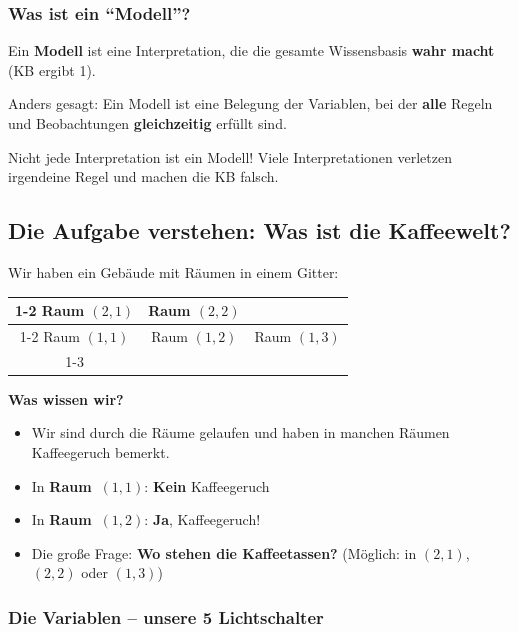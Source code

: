 \documentclass[a4paper,12pt]{article}
\begin{document}
\subsubsection*{Was ist ein "`Modell"'?}

\begin{merkbox}
Ein \textbf{Modell} ist eine Interpretation, die die gesamte Wissensbasis \textbf{wahr macht} (KB ergibt 1).

\medskip
Anders gesagt: Ein Modell ist eine Belegung der Variablen, bei der \textbf{alle} Regeln und Beobachtungen \textbf{gleichzeitig} erf\"ullt sind.

\medskip
Nicht jede Interpretation ist ein Modell! Viele Interpretationen verletzen irgendeine Regel und machen die KB falsch.
\end{merkbox}


\subsection{Die Aufgabe verstehen: Was ist die Kaffeewelt?}

Wir haben ein Geb\"aude mit R\"aumen in einem Gitter:

\begin{center}
\begin{tabular}{|c|c|c}
\cline{1-2}
Raum $(2{,}1)$ & Raum $(2{,}2)$ & \\
\cline{1-2}
Raum $(1{,}1)$ & Raum $(1{,}2)$ & Raum $(1{,}3)$ \\
\cline{1-3}
\end{tabular}
\end{center}

\textbf{Was wissen wir?}
\begin{itemize}
\item Wir sind durch die R\"aume gelaufen und haben in manchen R\"aumen Kaffeegeruch bemerkt.
\item In \textbf{Raum~$(1{,}1)$}: \textbf{Kein} Kaffeegeruch
\item In \textbf{Raum~$(1{,}2)$}: \textbf{Ja}, Kaffeegeruch!
\item Die gro\ss e Frage: \textbf{Wo stehen die Kaffeetassen?} (M\"oglich: in $(2{,}1)$, $(2{,}2)$ oder $(1{,}3)$)
\end{itemize}

\subsubsection*{Die Variablen -- unsere 5 Lichtschalter}
\end{document}
